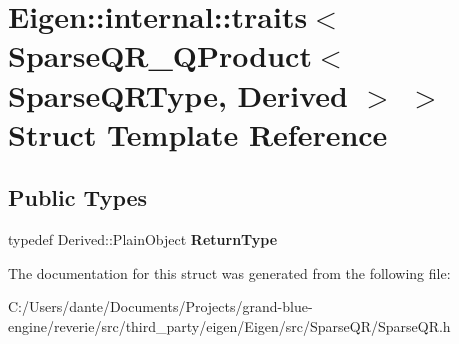\hypertarget{struct_eigen_1_1internal_1_1traits_3_01_sparse_q_r___q_product_3_01_sparse_q_r_type_00_01_derived_01_4_01_4}{}\section{Eigen\+::internal\+::traits$<$ Sparse\+Q\+R\+\_\+\+Q\+Product$<$ Sparse\+Q\+R\+Type, Derived $>$ $>$ Struct Template Reference}
\label{struct_eigen_1_1internal_1_1traits_3_01_sparse_q_r___q_product_3_01_sparse_q_r_type_00_01_derived_01_4_01_4}
\subsection*{Public Types}
\begin{DoxyCompactItemize}
\item 
\mbox{\label{struct_eigen_1_1internal_1_1traits_3_01_sparse_q_r___q_product_3_01_sparse_q_r_type_00_01_derived_01_4_01_4_ae1e596296cf3e313d0248b6ffadd37d4}} 
typedef Derived\+::\+Plain\+Object {\bfseries Return\+Type}
\end{DoxyCompactItemize}


The documentation for this struct was generated from the following file\+:\begin{DoxyCompactItemize}
\item 
C\+:/\+Users/dante/\+Documents/\+Projects/grand-\/blue-\/engine/reverie/src/third\+\_\+party/eigen/\+Eigen/src/\+Sparse\+Q\+R/Sparse\+Q\+R.\+h\end{DoxyCompactItemize}
